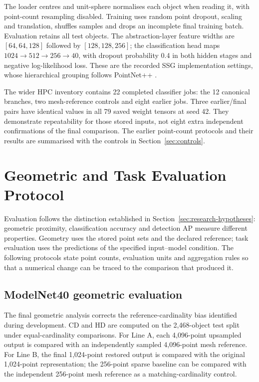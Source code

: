 The loader centres and unit-sphere normalises each object when
reading it, with point-count resampling disabled. Training uses
random point dropout, scaling and translation, shuffles samples and
drops an incomplete final training batch. Evaluation retains all
test objects. The abstraction-layer feature widths are
$[64,64,128]$ followed by $[128,128,256]$; the classification head
maps $1024\rightarrow512\rightarrow256\rightarrow40$, with dropout
probability 0.4 in both hidden stages and negative log-likelihood
loss. These are the recorded SSG implementation settings, whose
hierarchical grouping follows PointNet++ \cite{qi2017pointnetpp}.

The wider HPC inventory contains 22 completed classifier jobs: the
12 canonical branches, two mesh-reference controls and eight earlier
jobs. Three earlier/final pairs have identical values in all 79 saved
weight tensors at seed 42. They demonstrate repeatability for those
stored inputs, not eight extra independent confirmations of the final
comparison. The earlier point-count protocols and their results are
summarised with the controls in Section~\ref{sec:controls}.

\section{Geometric and Task Evaluation Protocol}
\label{sec:fc-4-10}

Evaluation follows the distinction established in
Section~\ref{sec:research-hypotheses}: geometric proximity, classification
accuracy and detection AP measure different properties. Geometry uses
the stored point sets and the declared reference; task evaluation uses
the predictions of the specified input--model condition. The following
protocols state point counts, evaluation units and aggregation rules so
that a numerical change can be traced to the comparison that produced it.

\subsection{ModelNet40 geometric evaluation}
\label{sec:fc-4-10-1}

The final geometric analysis corrects the reference-cardinality bias identified during development. CD and HD are computed on the 2,468-object test split under equal-cardinality comparisons. For Line A, each 4,096-point upsampled output is compared with an independently sampled 4,096-point mesh reference. For Line B, the final 1,024-point restored output is compared with the original 1,024-point representation; the 256-point sparse baseline can be compared with the independent 256-point mesh reference as a matching-cardinality control.

